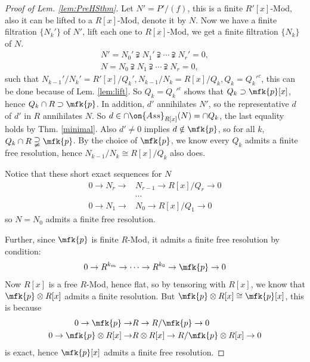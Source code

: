 \begin{proof}[Proof of Lem. \ref{lem:PreHSthm}]
	Let $N'=P'/(f)$, this is a finite $R'[x]$-Mod, also it can be lifted to a $R[x]$-Mod, denote it by $N$. Now we have a finite filtration $\{N_k'\}$ of $N'$, lift each one to $R[x]$-Mod, we get a finite filtration $\{N_k\}$ of $N$.
	\begin{equation*}
		\begin{split}
			N'=N_0'\supsetneqq N_1'\supsetneqq\cdots\supsetneqq N_r'=0,\\
			N=N_0\supsetneqq N_1\supsetneqq\cdots\supsetneqq N_r=0,
		\end{split}
	\end{equation*}
	such that $N_{k-1}'/N_k'=R'[x]/Q_k', N_{k-1}/N_k=R[x]/Q_k, Q_k=Q_k'^c$, this can be done because of Lem. \ref{lem:lift}. So $Q_k = Q_k'^c$ shows that $Q_k\supset\mfk{p}[x]$, hence $Q_k\cap R\supset\mfk{p}$. In addition, $d'$ annihilates $N'$, so the representative $d$ of $d'$ in $R$ annihilates $N$. So $d\in\cap\on{Ass}_{R[x]}(N)=\cap Q_k$, the last equality holds by Thm. \ref{minimal}. Also $d'\neq 0$ implies $d\notin\mfk{p}$, so for all $k$, $Q_k\cap R\supsetneqq\mfk{p}$. By the choice of $\mfk{p}$, we know every $Q_k$ admits a finite free resolution, hence $N_{k-1}/N_k\cong R[x]/Q_k$ also does.
	
	Notice that these short exact sequences for $N$
	\begin{equation*}
		\begin{split}
			0\rightarrow N_r\rightarrow &N_{r-1}\rightarrow R[x]/Q_r\rightarrow 0\\
			&\cdots\\
			0\rightarrow N_1\rightarrow &N_{0}\rightarrow R[x]/Q_1\rightarrow 0
		\end{split}
	\end{equation*}
	so $N=N_0$ admits a finite free resolution.
	
	Further, since $\mfk{p}$ is finite $R$-Mod, it admits a finite free resolution by condition:
	$$
	0\rightarrow R^{k_m}\rightarrow\cdots\rightarrow R^{k_0}\rightarrow\mfk{p}\rightarrow 0
	$$
	Now $R[x]$ is a free $R$-Mod, hence flat, so by tensoring with $R[x]$, we know that $\mfk{p}\otimes R[x]$ admits a finite resolution. But $\mfk{p}\otimes R[x]\cong\mfk{p}[x]$, this is because
	\begin{equation*}
		\begin{split}
			0\rightarrow\mfk{p}\rightarrow &R\rightarrow R/\mfk{p}\rightarrow0\\
			0\rightarrow\mfk{p}\otimes R[x]\rightarrow &R\otimes R[x]\rightarrow R/\mfk{p}\otimes R[x]\rightarrow0\\
		\end{split}
	\end{equation*}
	is exact, hence $\mfk{p}[x]$ admits a finite free resolution.
	

\end{proof}
